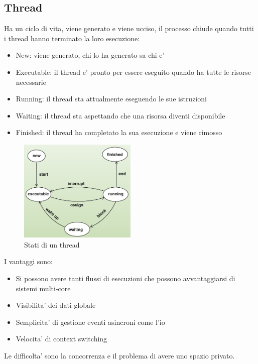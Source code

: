 \subsection{Thread}
Ha un ciclo di vita, viene generato e viene ucciso, il processo chiude quando tutti i thread hanno terminato la loro esecuzione:
\begin{itemize}
    \item New: viene generato, chi lo ha generato sa chi e' 
    \item Executable: il thread e' pronto per essere eseguito quando ha tutte le risorse necessarie
    \item Running: il thread sta attualmente eseguendo le sue istruzioni
    \item Waiting: il thread sta aspettando che una risorsa diventi disponibile
    \item Finished: il thread ha completato la sua esecuzione e viene rimosso
\end{itemize}

\begin{figure}[ht!]
    \centering
    \includegraphics[width=0.5\textwidth]{images/statiThread.png}
    \caption{Stati di un thread}
\end{figure}

I vantaggi sono:
\begin{itemize}
    \item Si possono avere tanti flussi di esecuzioni che possono avvantaggiarsi di sistemi multi-core
    \item Visibilita' dei dati globale
    \item Semplicita' di gestione eventi asincroni come l'io 
    \item Velocita' di context switching
\end{itemize}

Le difficolta' sono la concorrenza e il problema di avere uno spazio privato.

